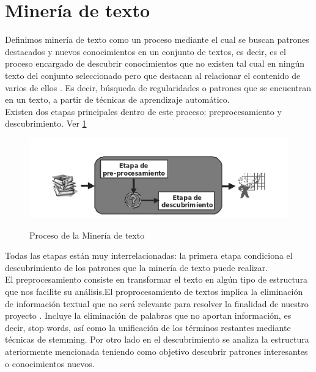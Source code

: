 \section{Miner\'ia de texto}

Definimos miner\'ia de texto como  un proceso mediante el cual se buscan patrones destacados y nuevos conocimientos en un conjunto de textos, es decir, es el proceso encargado de descubrir conocimientos que no existen tal cual en ning\'un texto del conjunto seleccionado pero que destacan al relacionar el contenido de varios de ellos \cite{min1}. Es decir, b\'usqueda de regularidades o patrones que se encuentran en un texto, a partir de t\'ecnicas de aprendizaje autom\'atico. \\

Existen dos etapas principales dentro de este proceso: preprocesamiento y descubrimiento. Ver \ref{fig:mineriatexto}\\


\begin{figure}
\begin{center}
	\label{mineriatexto}
	\includegraphics[scale=.6]{images/mintex}
	\label{fig:mineriatexto}
	\caption{Proceso de la Miner\'ia de texto}
\end{center}
\end{figure}


Todas las etapas est\'an muy interrelacionadas: la primera etapa condiciona el descubrimiento de los patrones que la miner\'ia de texto puede realizar. \\

El preprocesamiento consiste en transformar el texto en alg\'un tipo de estructura que nos facilite su an\'alisis.El proprocesamiento de textos implica la eliminaci\'on de informaci\'on textual que no ser\'a relevante para resolver la finalidad de nuestro proyecto \cite{min2}. Incluye la eliminaci\'on de palabras que no aportan informaci\'on, es decir, stop words, as\'i como la unificaci\'on de los t\'erminos restantes mediante t\'ecnicas de stemming.  Por otro lado en el descubrimiento se analiza la estructura ateriormente mencionada teniendo como objetivo descubrir patrones interesantes o conocimientos nuevos. \\

